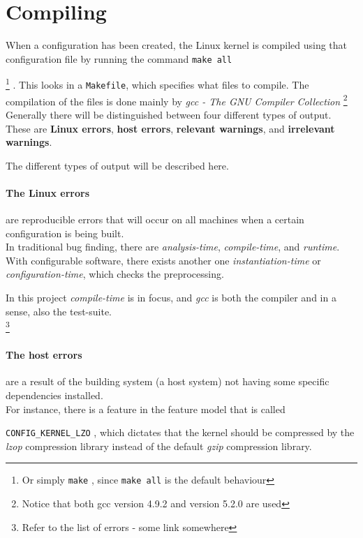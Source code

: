 \documentclass[a4paper,11pt]{report}
\newcommand{\textcode}[1]{
    \fboxsep=1pt
    \texttt{\colorbox{gray!20}{#1}}
}
\begin{document}
\section{Compiling}
When a configuration has been created, the Linux kernel is compiled using 
that configuration file by running the command \textcode{make all}
    \footnote{Or simply \textcode{make}, since \textcode{make all} is the 
        default behaviour}
. This looks in a \texttt{Makefile}, which specifies what files to compile. The 
compilation of the files is done mainly by \emph{gcc - The GNU Compiler 
Collection}
    \footnote{Notice that both gcc version 4.9.2 and version 5.2.0 are used}
\\
Generally there will be distinguished between four different types of output. 
These are \textbf{Linux errors}, \textbf{host errors}, 
\textbf{relevant warnings}, and \textbf{irrelevant warnings}. 

The different types of output will be described here.


    \paragraph{The Linux errors} 
are reproducible errors that will occur on all 
machines when a certain configuration is being built. 
\\

In traditional bug finding, there are \emph{analysis-time}, 
\emph{compile-time}, and \emph{runtime}. With configurable software, there 
exists another one \emph{instantiation-time} or \emph{configuration-time}, 
which checks the preprocessing.
    \cite{IntDatSPL}

In this project \emph{compile-time} is in focus, and \emph{gcc} is both the 
compiler and in a sense, also the test-suite.
\\


    \footnote{Refer to the list of errors - some link somewhere}

    \paragraph{The host errors} 
are a result of the building system (a host system) not having some specific 
dependencies installed.
\\

For instance, there is a feature in the feature model that is called 
\textcode{CONFIG\_KERNEL\_LZO}, which dictates that the kernel should be 
compressed by the \emph{lzop} compression library instead of the default 
\emph{gzip} compression library.
\end{document}
